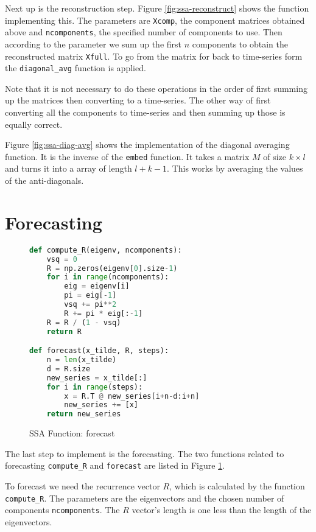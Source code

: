 Next up is the reconstruction step. Figure \ref{fig:ssa-reconstruct} shows the function implementing this. The parameters are \texttt{Xcomp}, the component matrices obtained above and \texttt{ncomponents}, the specified number of components to use. Then according to the parameter we sum up the first $n$ components to obtain the reconstructed matrix \texttt{Xfull}. To go from the matrix for back to time-series form the \texttt{diagonal\_avg} function is applied. 

Note that it is not necessary to do these operations in the order of first summing up the matrices then converting to a time-series. The other way of first converting all the components to time-series and then summing up those is equally correct. 

Figure \ref{fig:ssa-diag-avg} shows the implementation of the diagonal averaging function. It is the inverse of the \texttt{embed} function. It takes a matrix $M$ of size $k \times l$ and turns it into a array of length $l+k-1$. This works by averaging the values of the anti-diagonals. 

\section{Forecasting}

\begin{figure}
\begin{singlespace}
\begin{lstlisting}[language=Python]
def compute_R(eigenv, ncomponents):
    vsq = 0
    R = np.zeros(eigenv[0].size-1)
    for i in range(ncomponents):
        eig = eigenv[i]
        pi = eig[-1]
        vsq += pi**2
        R += pi * eig[:-1]
    R = R / (1 - vsq)
    return R

def forecast(x_tilde, R, steps):
    n = len(x_tilde)
    d = R.size
    new_series = x_tilde[:]
    for i in range(steps):
        x = R.T @ new_series[i+n-d:i+n]
        new_series += [x]
    return new_series
\end{lstlisting}
\end{singlespace}
\caption{SSA Function: forecast}    
\label{fig:ssa-forecast}
\end{figure}

The last step to implement is the forecasting. The two functions related to forecasting \texttt{compute\_R} and \texttt{forecast} are listed in Figure \ref{fig:ssa-forecast}. 

To forecast we need the recurrence vector $R$, which is calculated by the function \texttt{compute\_R}. The parameters are the eigenvectors and the chosen number of components \texttt{ncomponents}. The $R$ vector's length is one less than the length of the eigenvectors. 

